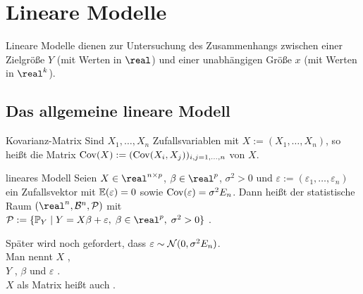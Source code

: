 \chapter{%
    Lineare Modelle%
}

\begin{Bem}
    Lineare Modelle dienen zur Untersuchung des Zusammenhangs zwischen einer Zielgröße $Y$
    (mit Werten in $\real$) und einer unabhängigen Größe $x$ (mit Werten in $\real^k$).
\end{Bem}

\section{%
    Das allgemeine lineare Modell%
}

\begin{Def}{Kovarianz-Matrix}
    Sind $X_1, \dotsc, X_n$ Zufallsvariablen mit $X := (X_1, \dotsc, X_n)$,
    so heißt die Matrix $\mathrm{Cov}(X) := (\mathrm{Cov}(X_i, X_j))_{i,j=1,\dotsc,n}$
     von $X$.
\end{Def}

\begin{Def}{lineares Modell}
    Seien $X \in \real^{n \times p}$, $\beta \in \real^p$, $\sigma^2 > 0$ und
    $\varepsilon := (\varepsilon_1, \dotsc, \varepsilon_n)$ ein
    Zufallsvektor mit $\mathbb{E}(\varepsilon) = 0$ sowie
    $\mathrm{Cov}(\varepsilon) = \sigma^2 E_n$.
    Dann heißt der statistische Raum $(\real^n, \B^n, \P)$ mit\\
    $\P := \{\PP_Y \;|\; Y = X\beta + \varepsilon,\; \beta \in \real^p,\; \sigma^2 > 0\}$
    .
\end{Def}

\begin{Bem}
    Später wird noch gefordert, dass $\varepsilon \sim \mathcal{N}(0, \sigma^2 E_n)$.\\
    Man nennt
    $X$ ,\\
    $Y$ ,
    $\beta$  und
    $\varepsilon$ .\\
    $X$ als Matrix heißt auch .
\end{Bem}

\linie

